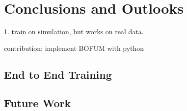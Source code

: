 \chapter{Conclusions and Outlooks} \label{chapter:6}

1. train on simulation, but works on real data.

contribution:
implement BOFUM with python

\section{End to End Training}

\section{Future Work}
